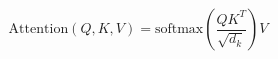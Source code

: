
\begin{equation}
\mathrm{Attention}(Q, K, V) = \mathrm{softmax}\left(\frac{QK^{T}}{\sqrt{d_k}}\right)V
\label{eq:attention}
\end{equation}


